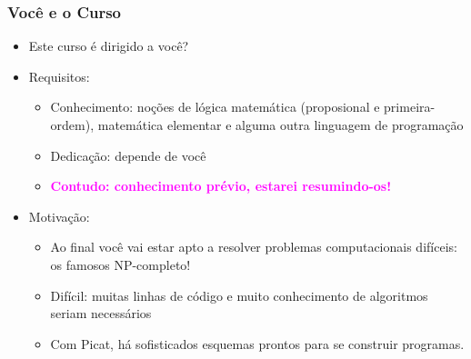 \begin{frame}[fragile]
  \frametitle{Você e o Curso}
  \begin{itemize}

    \item Este curso é dirigido a você?
  \pause
    \item Requisitos:
   \pause
		\begin{itemize}
			\item Conhecimento: noções de lógica matemática 
			(proposional e primeira-ordem), matemática elementar
			e alguma outra linguagem de programação

			\item Dedicação: depende de você
			\pause
		\item \textcolor{magenta}{\textbf{Contudo: conhecimento prévio, estarei resumindo-os!}}
		\end{itemize}
		
  \pause
    \item Motivação:
   \pause
		\begin{itemize}
			\item Ao final você vai estar apto a resolver problemas
			computacionais difíceis: os famosos NP-completo!
			
			\item Difícil: muitas linhas de código e muito conhecimento de algoritmos seriam
			necessários
			
			\item Com Picat, há sofisticados esquemas prontos para se construir programas.

		\end{itemize}

  \end{itemize}

\end{frame}


